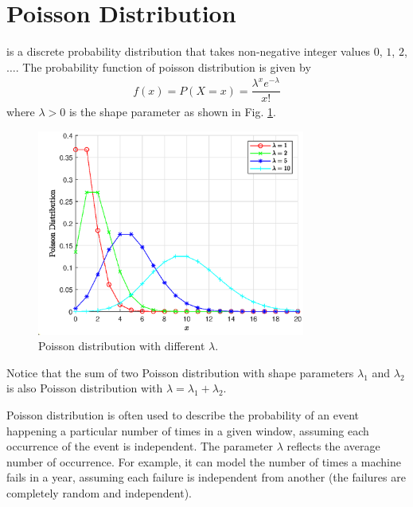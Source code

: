 \section{Poisson Distribution}

 is a discrete probability distribution that takes non-negative integer values $0$, $1$, $2$, $\ldots$. The probability function of poisson distribution is given by
\begin{eqnarray}
	f(x) = P(X=x) = \dfrac{\lambda^xe^{-\lambda}}{x!} \nonumber
\end{eqnarray}
where $\lambda >0$ is the shape parameter as shown in Fig. \ref{fig:poisson_pmf}.
\begin{figure}[!htb]
	\centering
	\includegraphics[width=250pt]{chapters/part-1/figures/poisson_pmf.eps}
	\caption{Poisson distribution with different $\lambda$.} \label{fig:poisson_pmf}
\end{figure}
Notice that the sum of two Poisson distribution with shape parameters $\lambda_1$ and $\lambda_2$ is also Poisson distribution with $\lambda = \lambda_1 + \lambda_2$.

Poisson distribution is often used to describe the probability of an event happening a particular number of times in a given window, assuming each occurrence of the event is independent. The parameter $\lambda$ reflects the average number of occurrence. For example, it can model the number of times a machine fails in a year, assuming each failure is independent from another (the failures are completely random and independent). 

